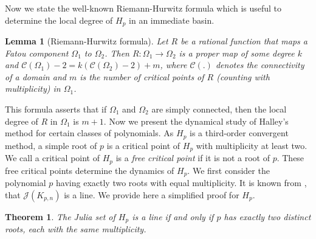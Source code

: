 \documentclass[12pt]{article}
\newtheorem{lem}{Lemma}[section]
\newtheorem{maintheorem}{Theorem}
\begin{document}
Now we state the well-known Riemann-Hurwitz formula which is useful to determine the local degree of $H_p$ in an immediate basin.
\begin{lem}[Riemann-Hurwitz formula]
Let $R$ be a rational function that maps a Fatou component $\Omega_1$ to $\Omega_2$. Then $R:\Omega_1\to \Omega_2$ is a proper map of some
degree $ k $ and $ \mathcal{C}(\Omega_1) - 2 = k(\mathcal{C}(\Omega_2 ) - 2) + m $, where $ \mathcal{C}(.) $ denotes the connectivity of a domain and $ m $ is the number of critical points of $ R $ (counting with multiplicity) in $\Omega_1$.
\end{lem}
This formula asserts that if $\Omega_1$ and $\Omega_2$ are simply connected, then the local degree of $R$ in $\Omega_1$ is $m+1$.
Now we present the dynamical study of Halley's method for certain classes of polynomials. As $H_p$ is a third-order convergent method, a simple root of $p$ is a critical point of $H_p$ with multiplicity at least two. We call a critical point of $H_p$ is a \textit{free critical point} if it is not a root of $p$. These free critical points determine the dynamics of $H_p$. We first consider the polynomial $p$ having exactly two roots with equal multiplicity. It is known from \cite[Theorem 3]{Liu-Gao2015}, that $\mathcal{J}(K_{p,n})$ is a line. We provide here a simplified proof for $H_p$.
\begin{maintheorem}\label{exact2}
	The Julia set of $H_p$ is a line if and only if $p$ has exactly two distinct roots, each with the same multiplicity.
\end{maintheorem}
\end{document}
